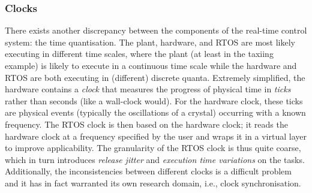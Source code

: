 \subsubsection{Clocks}%
%
There exists another discrepancy between the components of the real-time control system: the time quantisation.
The plant, hardware, and RTOS are most likely executing in different time scales, where the plant (at least in the taxiing example) is likely to execute in a continuous time scale while the hardware and RTOS are both executing in (different) discrete quanta.
Extremely simplified, the hardware contains a \emph{clock} that measures the progress of physical time in \emph{ticks} rather than seconds (like a wall-clock would).
For the hardware clock, these ticks are physical events (typically the oscillations of a crystal) occurring with a known frequency.
The RTOS clock is then based on the hardware clock; it reads the hardware clock at a frequency specified by the user and wraps it in a virtual layer to improve applicability. 
The granularity of the RTOS clock is thus quite coarse, which in turn introduces \emph{release jitter} and \emph{execution time variations} on the tasks.
Additionally, the inconsistencies between different clocks is a difficult problem and it has in fact warranted its own research domain, i.e., clock synchronisation.

